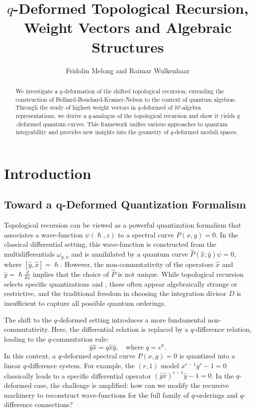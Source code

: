 \documentclass[reqno,11pt]{amsart}
\title{$q$-Deformed Topological Recursion, Weight Vectors and Algebraic Structures}
\author{Fridolin Melong and Raimar Wulkenhaar}
\theoremstyle{plain}
\theoremstyle{definition}
\theoremstyle{remark}
\numberwithin{equation}{section}
\newcommand{\1}{\mathds{1}}
\newcommand{\2}{\frac{1}{2}}
\begin{document}
	
	\begin{abstract}
		We investigate a $q$-deformation of the shifted topological recursion, extending the construction of Belliard-Bouchard-Kramer-Nelson to the context of quantum algebras. Through the study of highest weight vectors in $q$-deformed of $\mathcal{W}$-algebra representations, we derive a $q$-analogue of the topological recursion and show it yields $q$-deformed quantum curves. This framework unifies various approaches to quantum integrability and provides new insights into the geometry of $q$-deformed moduli spaces. 
	\end{abstract}
	
	\maketitle
	
	\tableofcontents
	
	
	
	\section{Introduction}
	\label{introduction}
	\subsection{Toward a q-Deformed Quantization Formalism}
	Topological recursion \cite{EO07} can be viewed as a powerful quantization formalism \cite{BE09} that associates a wave-function $\psi(\hslash,z)$ to a spectral curve $P(x,y)=0$. In the classical differential setting, this wave-function is constructed from the multidifferentials $\omega_{g,n}$ and is annihilated by a quantum curve $\hat{P}(\hat{x},\hat{y})\psi=0$, where $[\hat{y}, \hat{x}]=\hslash$. However, the non-commutativity of the operators $\hat{x}$ and $\hat{y}=\hslash\frac{d}{dx}$ implies that the choice of $\hat{P}$ is not unique. While topological recursion selects specific quantizations \cite{BE17} and \cite{EGMO21}, these often appear algebraically strange or restrictive, and the traditional freedom in choosing the integration divisor $D$ is insufficient to capture all possible quantum orderings.
	
	The shift to the $q$-deformed setting introduces a more fundamental non-commutativity. Here, the differential relation is replaced by a $q$-difference relation, leading to the $q$-commutation rule:
	\begin{equation}
		\hat{y}\hat{x} = q \hat{x}\hat{y}, \quad \text{where } q = e^{\hslash}.
	\end{equation}
	In this context, a $q$-deformed spectral curve $P(x,y)=0$ is quantized into a linear $q$-difference system. For example, the $(r,1)$ model $x^{r-1}y^r-1=0$ classically leads to a specific differential operator $(\hat{y}\hat{x})^{r-1}\hat{y}-1=0$. In the $q$-deformed case, the challenge is amplified: how can we modify the recursive machinery to reconstruct wave-functions for the full family of $q$-orderings and $q$-difference connections?
	
\end{document}
